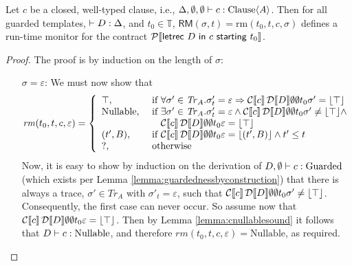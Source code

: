 \documentclass[orivec,final]{llncs-href}
\newcommand{\timeset}{\mathbb{T}}
\newcommand{\traceset}[1]{\mathit{Tr}_{#1}}
\newcommand{\rmf}{\mathsf{RM}}
\newcommand{\lift}[1]{\lfloor #1 \rfloor}
\newcommand{\trace}{\sigma}
\newcommand{\conforming}{\top}
\newcommand{\emptytrace}{\varepsilon}
\newcommand{\partialok}{\mathrm{Nullable}}
\newcommand{\inconclusive}{\mathrm{?}}
\newcommand{\ccontract}[3]{\mathsf{letrec}\ #1\ \mathsf{in}\ #2\
  \mathsf{starting}\ #3}
\begin{document}
\begin{theorem}
  Let $c$ be a closed, well-typed clause, i.e.,
  $\Delta,\emptyset,\emptyset \vdash c : \mathrm{Clause} \langle A \rangle$. Then for all
  guarded templates, $\vdash D : \Delta$, and $t_0 \in \timeset$,
  $\rmf(\trace,t) = \mathrm{rm}(t_0,t,c,\trace)$ defines a run-time
  monitor for the contract $\cdencontract{\ccontract{D}{c}{t_0}}$.
\end{theorem}
\begin{proof}
  The proof is by induction on the length of $\trace$:
  \begin{itemize}
  \item[$\trace = \emptytrace$:] We must now show that
    \[
    \mathit{rm}(t_0,t,c,\emptytrace) = \left\{
      \begin{array}{ll}
        \conforming, & \mbox{ if } \forall \trace' \in
        \traceset{A}. \trace'_t = \emptytrace \Rightarrow
        \cdenclause{c}{\cdencontext{D}}{\emptyset}{\emptyset}{t_0}{\trace'}
        = \lift{\conforming}\\
        \partialok, & \mbox{ if } \exists \trace' \in
        \traceset{A}. \trace'_t = \emptytrace \land
        \cdenclause{c}{\cdencontext{D}}{\emptyset}{\emptyset}{t_0}{\trace'}
        \neq \lift{\conforming} \land\\
        &\hspace{12.5pt}
        \cdenclause{c}{\cdencontext{D}}{\emptyset}{\emptyset}{t_0}{\emptytrace}
        = \lift{\conforming}\\
        (t',B), & \mbox{ if }
        \cdenclause{c}{\cdencontext{D}}{\emptyset}{\emptyset}{t_0}{\emptytrace}
        = \lift{(t',B)} \land t' \leq t\\
        \inconclusive, & \mbox{ otherwise}
      \end{array}
    \right.
    \]
    Now, it is easy to show by induction on the derivation of
    $D, \emptyset \vdash c : \mathrm{Guarded}$ (which exists per Lemma
    \ref{lemma:guardednessbyconstruction}) that there is always a
    trace, $\trace' \in \traceset{A}$ with $\trace'_t = \emptytrace$,
    such that
    $\cdenclause{c}{\cdencontext{D}}{\emptyset}{\emptyset}{t_0}{\trace'}
    \neq \lift{\conforming}$. Consequently, the first case can never
    occur. So assume now that
    $\cdenclause{c}{\cdencontext{D}}{\emptyset}{\emptyset}{t_0}{\emptytrace}
    = \lift{\conforming}$. Then by Lemma \ref{lemma:cnullablesound} it
    follows that $\cnullable{D}{c}$, and therefore
    $\mathit{rm}(t_0,t,c,\emptytrace) = \partialok$, as required.


\end{itemize}
\end{proof}
\end{document}
